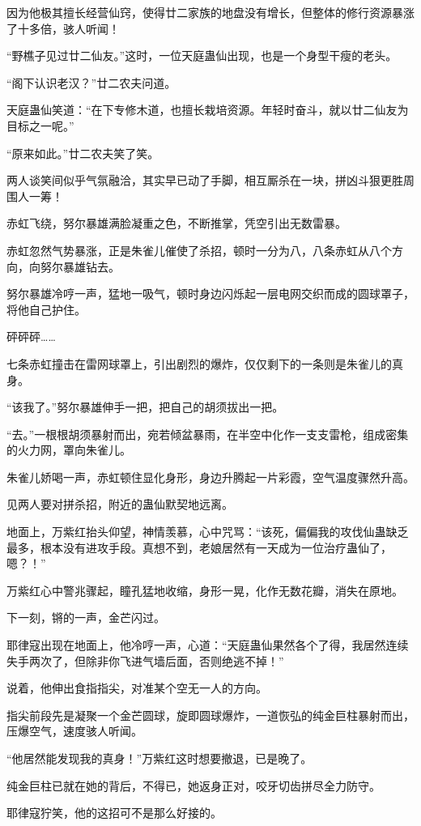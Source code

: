 \begin{this_body}
因为他极其擅长经营仙窍，使得廿二家族的地盘没有增长，但整体的修行资源暴涨了十多倍，骇人听闻！

“野樵子见过廿二仙友。”这时，一位天庭蛊仙出现，也是一个身型干瘦的老头。

“阁下认识老汉？”廿二农夫问道。

天庭蛊仙笑道：“在下专修木道，也擅长栽培资源。年轻时奋斗，就以廿二仙友为目标之一呢。”

“原来如此。”廿二农夫笑了笑。

两人谈笑间似乎气氛融洽，其实早已动了手脚，相互厮杀在一块，拼凶斗狠更胜周围人一筹！

赤虹飞绕，努尔暴雄满脸凝重之色，不断推掌，凭空引出无数雷暴。

赤虹忽然气势暴涨，正是朱雀儿催使了杀招，顿时一分为八，八条赤虹从八个方向，向努尔暴雄钻去。

努尔暴雄冷哼一声，猛地一吸气，顿时身边闪烁起一层电网交织而成的圆球罩子，将他自己护住。

砰砰砰……

七条赤虹撞击在雷网球罩上，引出剧烈的爆炸，仅仅剩下的一条则是朱雀儿的真身。

“该我了。”努尔暴雄伸手一把，把自己的胡须拔出一把。

“去。”一根根胡须暴射而出，宛若倾盆暴雨，在半空中化作一支支雷枪，组成密集的火力网，罩向朱雀儿。

朱雀儿娇喝一声，赤虹顿住显化身形，身边升腾起一片彩霞，空气温度骤然升高。

见两人要对拼杀招，附近的蛊仙默契地远离。

地面上，万紫红抬头仰望，神情羡慕，心中咒骂：“该死，偏偏我的攻伐仙蛊缺乏最多，根本没有进攻手段。真想不到，老娘居然有一天成为一位治疗蛊仙了，嗯？！”

万紫红心中警兆骤起，瞳孔猛地收缩，身形一晃，化作无数花瓣，消失在原地。

下一刻，锵的一声，金芒闪过。

耶律寇出现在地面上，他冷哼一声，心道：“天庭蛊仙果然各个了得，我居然连续失手两次了，但除非你飞进气墙后面，否则绝逃不掉！”

说着，他伸出食指指尖，对准某个空无一人的方向。

指尖前段先是凝聚一个金芒圆球，旋即圆球爆炸，一道恢弘的纯金巨柱暴射而出，压爆空气，速度骇人听闻。

“他居然能发现我的真身！”万紫红这时想要撤退，已是晚了。

纯金巨柱已就在她的背后，不得已，她返身正对，咬牙切齿拼尽全力防守。

耶律寇狞笑，他的这招可不是那么好接的。


\end{this_body}
